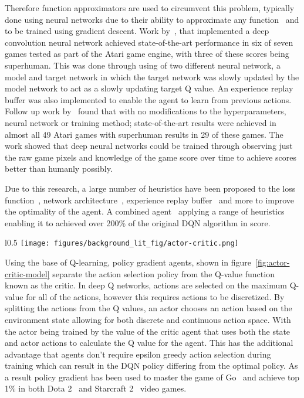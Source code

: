Therefore function approximators are used to circumvent this problem, typically done using neural networks due to their
ability to approximate any function~\citep{csaji2001approximation} and to be trained using gradient descent.
Work by~\cite{atari}, that implemented a deep convolution neural network achieved state-of-the-art performance in six
of seven games tested as part of the Atari game engine, with three of these scores being superhuman. This was done
through using of two different neural network, a model and target network in which the target network was slowly
updated by the model network to act as a slowly updating target Q value. An experience replay buffer was also
implemented to enable the agent to learn from previous actions.
Follow up work by~\cite{mnih2015humanlevel} found that with no modifications to the hyperparameters, neural network or
training method; state-of-the-art results were achieved in almost all 49 Atari games with superhuman results in 29 of
these games. The work showed that deep neural networks could be trained through observing just the raw game pixels and
knowledge of the game score over time to achieve scores better than humanly possibly.

Due to this research, a large number of heuristics have been proposed to the loss function~\citep{doubledqn},
network architecture~\citep{duelingdqn}, experience replay buffer~\citep{prioritizedexperiencereplay} and more to
improve the optimality of the agent. A combined agent~\citep{rainbow} applying a range of heuristics enabling it to
achieved over 200\% of the original DQN algorithm in score.

\begin{wrapfigure}{l}{0.5\textwidth}
    \texttt{[image: figures/background\_lit\_fig/actor-critic.png]}
    \caption{Actor Critic model (Source: ~\cite{Sutton1998})}
    \label{fig:actor-critic-model}
\end{wrapfigure}

Using the base of Q-learning, policy gradient agents, shown in figure~\ref{fig:actor-critic-model} separate the action
selection policy from the Q-value function known as the critic. In deep Q networks, actions are selected on the maximum
Q-value for all of the actions, however this requires actions to be discretized. By splitting the actions from the Q
values, an actor chooses an action based on the environment state allowing for both discrete and continuous action space.
With the actor being trained by the value of the critic agent that uses both the state and actor actions to calculate the
Q value for the agent. This has the additional advantage that agents don't require epsilon greedy action selection during
training which can result in the DQN policy differing from the optimal policy. As a result policy gradient has been
used to master the game of Go~\citep{silver2017mastering} and achieve top 1\% in both
Dota 2~\citep{OpenAI_dota} and Starcraft 2~\citep{starcraft2} video games.